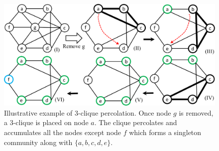 \begin{figure}[!t]
\centering
\includegraphics[width=\columnwidth]{./texfiles/Chapter_2/figures/percolation}
\caption{Illustrative example of 3-clique percolation. Once node $g$ is removed, a 3-clique is placed on node $a$. The clique  percolates and accumulates all the nodes except node $f$ which forms a singleton community along with $\{a,b,c,d,e\}$.}\label{fig_percolation} 
\end{figure}


